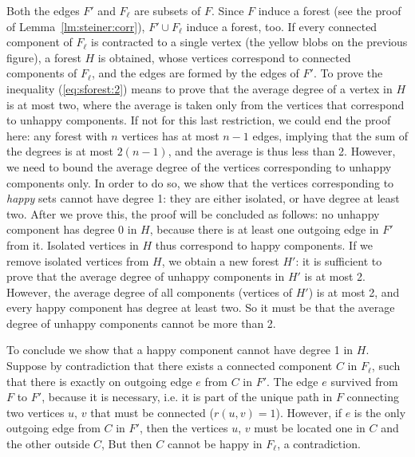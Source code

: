 \begin{dokaz}
\noindent
Both the edges $F'$ and $F_\ell$ are subsets of $F$. Since $F$ induce a forest (see the proof of 
Lemma~\ref{lm:steiner:corr}), $F'\cup F_\ell$ induce a forest, too. If every connected component of $F_\ell$
is contracted to a single vertex (the yellow blobs on the previous figure), a forest $H$ is obtained, whose
vertices correspond to connected components of $F_\ell$, and the edges are formed by the edges of $F'$. To prove
the inequality  (\ref{eq:sforest:2}) means to prove that the average degree of a vertex in $H$ is at most two,
where the average is taken only from the vertices that correspond to unhappy components.
If not for this last restriction, we could end the proof here: any forest with $n$ vertices has at most
$n-1$ edges, implying that the sum of the degrees is at most $2(n-1)$, and the average is thus less than 2.
However, we need to bound the average degree of the vertices corresponding to unhappy components only.
In order to do so, we show that the vertices corresponding to {\em happy} sets cannot have degree 1: they
are either isolated, or have degree at least two. After we prove this, the proof will be concluded as follows:
no unhappy component has degree 0 in $H$, because there is at least one outgoing edge in $F'$ from it.
Isolated vertices in $H$ thus correspond to happy components. If we remove isolated vertices from $H$, 
we obtain a new forest $H'$: it is sufficient to prove that the average degree of unhappy components in $H'$
is at most 2. However, the average degree of all components (vertices of $H'$) is at most 2, and
every happy component has degree at least two. So it must be that the average degree of unhappy components
cannot be more than 2.

To conclude we show that a happy component cannot have degree 1 in $H$. Suppose by contradiction that 
there exists a connected component $C$ in $F_\ell$, such that there is exactly on outgoing edge $e$ from
$C$ in $F'$. The edge $e$ survived from $F$ to $F'$, because it is necessary, i.e. it is part of the
unique path in $F$ connecting two vertices $u$, $v$ that must be connected ($r(u,v)=1$).
However, if $e$ is the only outgoing edge from $C$ in $F'$, then the vertices $u$, $v$ must be located one in $C$
and the other outside $C$, But then $C$ cannot be happy in $F_\ell$, a contradiction.

\end{dokaz}




